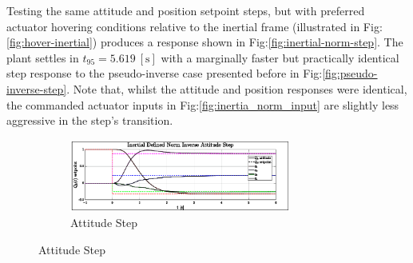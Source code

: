 Testing the same attitude and position setpoint steps, but with preferred actuator hovering conditions relative to the inertial frame (illustrated in Fig:\ref{fig:hover-inertial}) produces a response shown in Fig:\ref{fig:inertial-norm-step}. The plant settles in $t_{95}=5.619~[\text{s}]$ with a marginally faster but practically identical step response to the pseudo-inverse case presented before in Fig:\ref{fig:pseudo-inverse-step}. Note that, whilst the attitude and position responses were identical, the commanded actuator inputs in Fig:\ref{fig:inertia_norm_input} are slightly less aggressive in the step's transition.
\begin{figure}[hbtp]
\vspace{-8pt}
\centering
\begin{subfigure}{\textwidth}
\centering
\includegraphics[width=0.8\textwidth]{graphs/inertial_norm_attitude}
\vspace{-6pt}
\caption{Attitude Step}
\label{fig:inertial_norm_attitude}
\end{subfigure}
\end{figure}
\newpage
